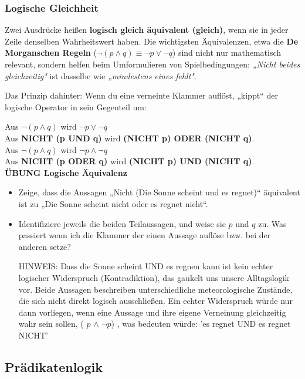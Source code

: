 \documentclass[parskip=half,a4paper,11pt]{scrreprt}
\begin{document}
\newpage
\subsubsection{Logische Gleichheit}

Zwei Ausdrücke heißen \textbf{logisch gleich äquivalent (gleich)}, wenn sie in jeder Zeile denselben Wahrheitswert haben. Die wichtigsten Äquivalenzen, etwa die \textbf{De Morganschen Regeln} ($\neg(p \land q) \equiv \neg p \lor \neg q$) sind nicht nur mathematisch relevant, sondern helfen beim Umformulieren von Spielbedingungen: \textit{„Nicht beides gleichzeitig"} ist dasselbe wie \textit{„mindestens eines fehlt"}.

Das Prinzip dahinter: Wenn du eine verneinte Klammer auflöst, „kippt“ der logische Operator in sein Gegenteil um:

Aus $\neg(p \land q)$ wird $\neg p \lor \neg q$ \\
Aus \textbf{NICHT (p UND q)} wird \textbf{(NICHT p) ODER (NICHT q)}.\\

Aus $\neg(p \land q)$ wird $\neg p \land \neg q$ \\
Aus \textbf{NICHT (p ODER q)} wird \textbf{(NICHT p) UND (NICHT q)}.\\

\textbf{ÜBUNG Logische Äquivalenz}

\begin{itemize}
    \item Zeige, dass die Aussagen „Nicht (Die Sonne scheint und es regnet)“  äquivalent ist zu „Die Sonne scheint nicht oder es regnet nicht“.
    \item Identifiziere jeweils die beiden Teilaussagen, und weise sie $p$ und $q$ zu. Was passiert wenn ich die Klammer der einen Aussage auflöse bzw. bei der anderen setze?

HINWEIS: Dass die Sonne scheint UND es regnen kann ist kein echter logischer Widerspruch (Kontradiktion), das gaukelt uns unsere Alltagslogik vor. Beide Aussagen beschreiben unterschiedliche meteorologische Zustände, die sich nicht direkt logisch ausschließen. Ein echter Widerspruch würde nur dann vorliegen, wenn eine Aussage und ihre eigene Verneinung gleichzeitig wahr sein sollen, ( $p$  $\land$ $\neg p$) , was bedeuten würde:  'es regnet UND es regnet NICHT'
\end{itemize}

\subsection{Prädikatenlogik}
\end{document}
